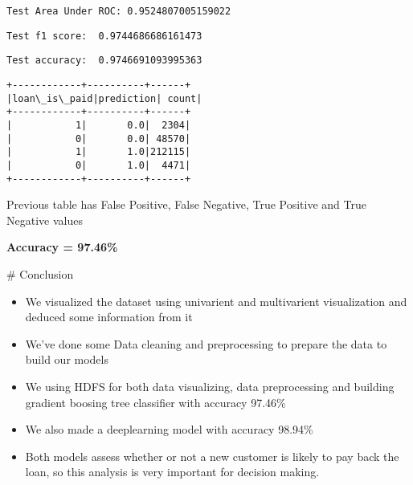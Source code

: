 \documentclass[11pt]{article}
\providecommand{\tightlist}{%
      \setlength{\itemsep}{0pt}\setlength{\parskip}{0pt}}
\begin{document}
    \begin{Verbatim}[commandchars=\\\{\}]
Test Area Under ROC: 0.9524807005159022
    \end{Verbatim}

    \begin{Verbatim}[commandchars=\\\{\}]
Test f1 score:  0.9744686686161473
    \end{Verbatim}

    \begin{Verbatim}[commandchars=\\\{\}]
Test accuracy:  0.9746691093995363
    \end{Verbatim}

    \begin{Verbatim}[commandchars=\\\{\}]
+------------+----------+------+
|loan\_is\_paid|prediction| count|
+------------+----------+------+
|           1|       0.0|  2304|
|           0|       0.0| 48570|
|           1|       1.0|212115|
|           0|       1.0|  4471|
+------------+----------+------+

    \end{Verbatim}

    Previous table has False Positive, False Negative, True Positive and
True Negative values

    \textbf{Accuracy = 97.46\%}

    \# Conclusion

    \begin{itemize}
\tightlist
\item
  We visualized the dataset using univarient and multivarient
  visualization and deduced some information from it
\item
  We've done some Data cleaning and preprocessing to prepare the data to
  build our models
\item
  We using HDFS for both data visualizing, data preprocessing and
  building gradient boosing tree classifier with accuracy 97.46\%
\item
  We also made a deeplearning model with accuracy 98.94\%
\item
  Both models assess whether or not a new customer is likely to pay back
  the loan, so this analysis is very important for decision making.
\end{itemize}


    
    
    
\end{document}
